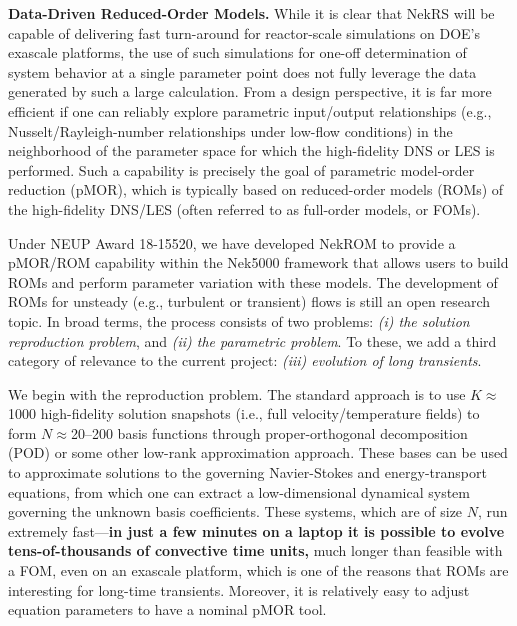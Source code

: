 \noindent
{\bf Data-Driven Reduced-Order Models.}
While it is clear that NekRS will be capable of delivering fast turn-around
for reactor-scale simulations on DOE's exascale platforms, the use of 
such simulations for one-off determination of system behavior at a single
parameter point does not fully leverage the data generated by such a large
calculation.
From a design perspective, it is far more efficient if one can reliably
explore parametric input/output relationships (e.g., Nusselt/Rayleigh-number
relationships under low-flow conditions) in the neighborhood of the parameter
space for which the high-fidelity DNS or LES is performed.   Such a capability
is precisely the goal of parametric model-order reduction (pMOR), which is
typically based on reduced-order models (ROMs) of the high-fidelity DNS/LES
(often referred to as full-order models, or FOMs).   

Under NEUP Award 18-15520, we have developed NekROM to provide a
pMOR/ROM capability within the Nek5000 framework that allows users to build
ROMs and perform parameter variation with these models.  The development of
ROMs for unsteady (e.g., turbulent or transient) flows is still an open
research topic.  In broad terms, the process consists of two problems: {\em (i)
the solution reproduction problem}, and {\em (ii) the parametric problem}.  To
these, we add a third category of relevance to the current project: {\em (iii)
evolution of long transients}.

We begin with the reproduction problem. The standard approach is to use
$K$$\approx$1000 high-fidelity solution snapshots (i.e., full velocity/temperature
fields) to form $N$$\approx$20--200 basis functions through 
proper-orthogonal decomposition (POD) or some other low-rank approximation
approach.  These bases can be used to approximate solutions to the governing
Navier-Stokes and energy-transport equations, from which one can extract a 
low-dimensional dynamical system governing the unknown basis coefficients.  
These systems, which are of size $N$, run extremely fast---{\bf in just a few
minutes on a laptop it is possible to evolve tens-of-thousands of convective
time units,} much longer than feasible with a FOM, even on an exascale platform,
which is one of the reasons that ROMs are interesting for long-time transients.
Moreover, it is relatively easy to adjust equation parameters to have a nominal
pMOR tool.  

